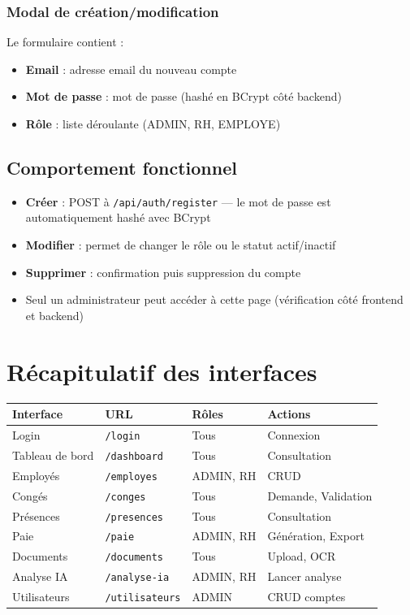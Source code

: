 \documentclass[12pt,a4paper]{report}
\begin{document}
\subsection{Modal de création/modification}

Le formulaire contient :
\begin{itemize}
    \item \textbf{Email} : adresse email du nouveau compte
    \item \textbf{Mot de passe} : mot de passe (hashé en BCrypt côté backend)
    \item \textbf{Rôle} : liste déroulante (ADMIN, RH, EMPLOYE)
\end{itemize}

\section{Comportement fonctionnel}

\begin{itemize}
    \item \textbf{Créer} : POST à \texttt{/api/auth/register} — le mot de passe est automatiquement hashé avec BCrypt
    \item \textbf{Modifier} : permet de changer le rôle ou le statut actif/inactif
    \item \textbf{Supprimer} : confirmation puis suppression du compte
    \item Seul un administrateur peut accéder à cette page (vérification côté frontend et backend)
\end{itemize}

\chapter{Récapitulatif des interfaces}

\begin{longtable}{|p{3.5cm}|p{4cm}|p{3cm}|p{3cm}|}
\hline
\textbf{Interface} & \textbf{URL} & \textbf{Rôles} & \textbf{Actions} \\
\hline
Login & \texttt{/login} & Tous & Connexion \\
\hline
Tableau de bord & \texttt{/dashboard} & Tous & Consultation \\
\hline
Employés & \texttt{/employes} & ADMIN, RH & CRUD \\
\hline
Congés & \texttt{/conges} & Tous & Demande, Validation \\
\hline
Présences & \texttt{/presences} & Tous & Consultation \\
\hline
Paie & \texttt{/paie} & ADMIN, RH & Génération, Export \\
\hline
Documents & \texttt{/documents} & Tous & Upload, OCR \\
\hline
Analyse IA & \texttt{/analyse-ia} & ADMIN, RH & Lancer analyse \\
\hline
Utilisateurs & \texttt{/utilisateurs} & ADMIN & CRUD comptes \\
\hline
\end{longtable}
\end{document}
